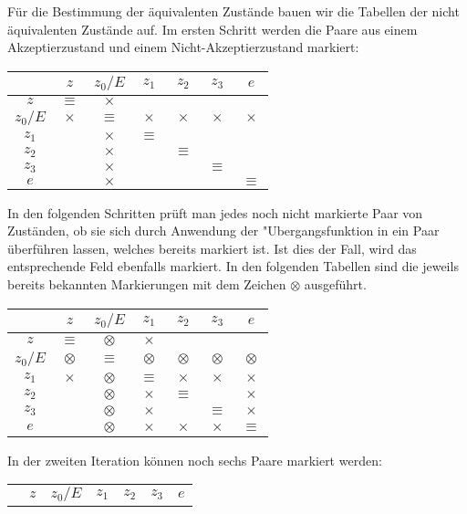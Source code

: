 \begin{loesung}
\begin{center}
\begin{tikzpicture}[>=latex,thick]
\end{tikzpicture}
\end{center}
Für die Bestimmung der äquivalenten Zustände bauen wir die Tabellen
der nicht äquivalenten Zustände auf. Im ersten Schritt werden die
Paare aus einem Akzeptierzustand und einem Nicht-Akzeptierzustand markiert:
\begin{center}
\begin{tabular}{|c|cccccc|}
\hline
&$z$&$z_0/E$&$z_1$&$z_2$&$z_3$&$e$\\
\hline
$z$&$\equiv$&$\times$&&&&\\
$z_0/E$&$\times$&$\equiv$&$\times$&$\times$&$\times$&$\times$\\
$z_1$&&$\times$&$\equiv$&&&\\
$z_2$&&$\times$&&$\equiv$&&\\
$z_3$&&$\times$&&&$\equiv$&\\
$e$&&$\times$&&&&$\equiv$\\
\hline
\end{tabular}
\end{center}
In den folgenden Schritten prüft man jedes noch nicht markierte Paar
von Zuständen, ob sie sich durch Anwendung der "Ubergangsfunktion
in ein Paar überführen lassen, welches bereits markiert ist. Ist dies
der Fall, wird das entsprechende Feld ebenfalls markiert. In den folgenden
Tabellen sind die jeweils bereits bekannten Markierungen mit dem Zeichen
$\otimes$ ausgeführt.
\begin{center}
\begin{tabular}{|c|cccccc|}
\hline
&$z$&$z_0/E$&$z_1$&$z_2$&$z_3$&$e$\\
\hline
$z$&$\equiv$&$\otimes$&$\times$&&&\\
$z_0/E$&$\otimes$&$\equiv$&$\otimes$&$\otimes$&$\otimes$&$\otimes$\\
$z_1$&$\times$&$\otimes$&$\equiv$&$\times$&$\times$&$\times$\\
$z_2$&&$\otimes$&$\times$&$\equiv$&&$\times$\\
$z_3$&&$\otimes$&$\times$&&$\equiv$&$\times$\\
$e$&&$\otimes$&$\times$&$\times$&$\times$&$\equiv$\\
\hline
\end{tabular}
\end{center}
In der zweiten Iteration können noch sechs Paare markiert werden:
\begin{center}
\begin{tabular}{|c|cccccc|}
\hline
&$z$&$z_0/E$&$z_1$&$z_2$&$z_3$&$e$\\

\end{tabular}
\end{center}
\end{loesung}
